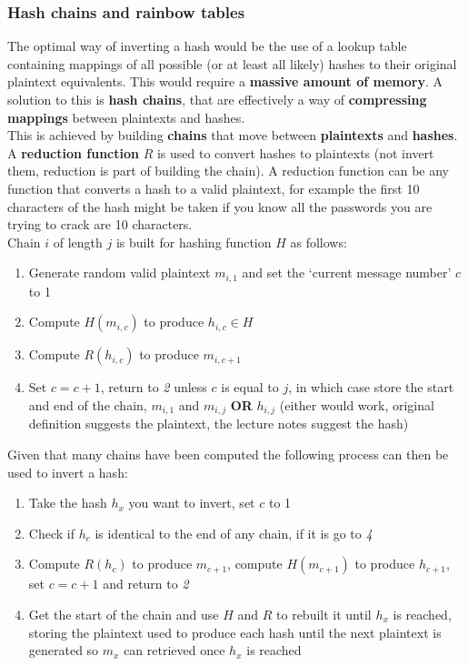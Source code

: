 \documentclass{article}
\newcommand{\np}{\vspace{8pt} \\}
\begin{document}
\subsubsection{Hash chains and rainbow tables}
The optimal way of inverting a hash would be the use of a lookup table containing mappings of all possible (or at least all likely) hashes to their original plaintext equivalents. This would require a \textbf{massive amount of memory}. A solution to this is \textbf{hash chains}, that are effectively a way of \textbf{compressing mappings} between plaintexts and hashes. \np
This is achieved by building \textbf{chains} that move between \textbf{plaintexts} and \textbf{hashes}. A \textbf{reduction function} $ R $ is used to convert hashes to plaintexts (not invert them, reduction is part of building the chain). A reduction function can be any function that converts a hash to a valid plaintext, for example the first 10 characters of the hash might be taken if you know all the passwords you are trying to crack are 10 characters. \np
Chain $ i $ of length $ j $ is built for hashing function $ H $ as follows:
\begin{enumerate}
	\item Generate random valid plaintext $ m_{i,1} $ and set the `current message number' $ c $ to 1
	\item Compute $ H(m_{i,c}) $ to produce $ h_{i,c} \in H $
	\item Compute $ R(h_{i,c}) $ to produce $ m_{i,c+1} $
	\item Set $ c = c + 1 $, return to \textit{2} unless $ c $ is equal to $ j $, in which case store the start and end of the chain, $ m_{i,1} $ and $ m_{i,j} $ \textbf{OR} $ h_{i,j} $ (either would work, original definition suggests the plaintext, the lecture notes suggest the hash)
\end{enumerate}
Given that many chains have been computed the following process can then be used to invert a hash:
\begin{enumerate}
	\item Take the hash $ h_{x} $ you want to invert, set $ c $ to 1
	\item Check if $ h_{c} $ is identical to the end of any chain, if it is go to \textit{4}
	\item Compute $ R(h_{c}) $ to produce $ m_{c+1} $, compute $ H(m_{c+1}) $ to produce $ h_{c+1} $, set $ c = c + 1 $ and return to \textit{2}
	\item Get the start of the chain and use $ H $ and $ R $ to rebuilt it until $ h_{x} $ is reached, storing the plaintext used to produce each hash until the next plaintext is generated so $ m_{x} $ can retrieved once $ h_{x} $ is reached
\end{enumerate}
\end{document}
